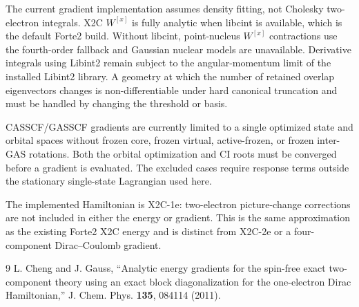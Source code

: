 \documentclass[aip,jcp,preprint]{revtex4-1}
\newcommand{\xcoord}{{[x]}}
\begin{document}
The current gradient implementation assumes density fitting, not Cholesky
two-electron integrals.  X2C $W^\xcoord$ is fully analytic when libcint is
available, which is the default Forte2 build.  Without libcint, point-nucleus
$W^\xcoord$ contractions use the fourth-order fallback and Gaussian nuclear
models are unavailable.  Derivative integrals using Libint2 remain subject to
the angular-momentum limit of the installed Libint2 library.  A geometry at
which the number of retained overlap eigenvectors changes is
non-differentiable under hard canonical truncation and must be handled by
changing the threshold or basis.

CASSCF/GASSCF gradients are currently limited to a single optimized state and
orbital spaces without frozen core, frozen virtual, active-frozen, or frozen
inter-GAS rotations.  Both the orbital optimization and CI roots must be
converged before a gradient is evaluated.  The excluded cases require response
terms outside the stationary single-state Lagrangian used here.

The implemented Hamiltonian is X2C-1e: two-electron picture-change corrections
are not included in either the energy or gradient.  This is the same
approximation as the existing Forte2 X2C energy and is distinct from X2C-2e or
a four-component Dirac--Coulomb gradient.

\begin{thebibliography}{9}
L. Cheng and J. Gauss,
``Analytic energy gradients for the spin-free exact two-component theory using
an exact block diagonalization for the one-electron Dirac Hamiltonian,''
J. Chem. Phys. \textbf{135}, 084114 (2011).
\end{thebibliography}
\end{document}
